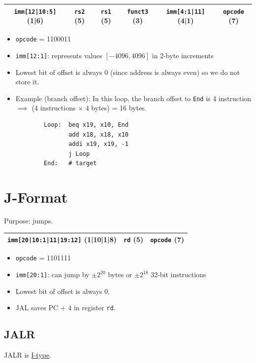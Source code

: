 \medskip
\begin{tabular}{|c|c|c|c|c|c|}
    \hline
    \texttt{imm[12|10:5]} (1|6) &
    \texttt{rs2} (5) &
    \texttt{rs1} (5) &
    \texttt{funct3} (3) &
    \texttt{imm[4:1|11]} (4|1) &
    \texttt{opcode} (7) \\
    \hline
\end{tabular}
\begin{itemize}
    \item \texttt{opcode} = 1100011
    \item \texttt{imm[12:1]}: represents values \([-4096, 4096]\) in 2-byte increments
    \item Lowest bit of offset is always 0 (since address is always even) so we do not store it.
    \item Example (branch offset): In this loop, the branch offset to \texttt{End} is 4 instruction \(\implies\) (4 instructions \(\times\) 4 bytes) = 16 bytes.
        \begin{verbatim}
        Loop:  beq x19, x10, End
               add x18, x18, x10
               addi x19, x19, -1
               j Loop
        End:   # target
    \end{verbatim}
\end{itemize}

\section{J-Format}
Purpose: jumps.

\medskip
\begin{tabular}{|c|c|c|}
    \hline
    \texttt{imm[20|10:1|11|19:12]} (1|10|1|8) &
    \texttt{rd} (5) &
    \texttt{opcode} (7) \\
    \hline
\end{tabular}
\begin{itemize}
    \item \texttt{opcode} = 1101111
    \item \texttt{imm[20:1]}: can jump by \(\pm 2^{20}\) bytes or \(\pm 2^{18}\) 32-bit instructions
    \item Lowest bit of offset is always 0.
    \item JAL saves PC + 4 in register \texttt{rd}.
\end{itemize}

\subsection{JALR}
JALR is \underline{I-type}.

